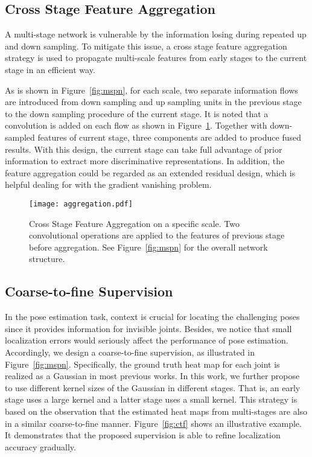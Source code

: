 \documentclass[10pt,twocolumn,letterpaper]{article}
\begin{document}
\subsection{Cross Stage Feature Aggregation}\label{section:CSFA}
\label{part:csfa}
A multi-stage network is vulnerable by the information losing during repeated up and down sampling. To mitigate this issue, a cross stage feature aggregation strategy is used to propagate multi-scale features from early stages to the current stage in an efficient way.

As is shown in Figure~\ref{fig:mspn}, for each scale, two separate information flows are introduced from down sampling and up sampling units in the previous stage to the down sampling procedure of the current stage. It is noted that a  convolution is added on each flow as shown in Figure~\ref{fig:aggr}. Together with down-sampled features of current stage, three components are added to produce fused results. With this design, the current stage can take full advantage of prior information to extract more discriminative representations. In addition, the feature aggregation could be regarded as an extended residual design, which is helpful dealing for with the gradient vanishing problem. 

\begin{figure}
	\centering
	\texttt{[image: aggregation.pdf]}
	\caption{Cross Stage Feature Aggregation on a specific scale. Two  convolutional operations are applied to the features of previous stage before aggregation. See Figure~\ref{fig:mspn} for the overall network structure.}
	\label{fig:aggr}
\end{figure}

\subsection{Coarse-to-fine Supervision}\label{setion:C2F}

In the pose estimation task, context is crucial for locating the challenging poses since it provides information for invisible joints. Besides, we notice that small localization errors would seriously affect the performance of pose estimation. Accordingly, we design a coarse-to-fine supervision, as illustrated in Figure~\ref{fig:mspn}. Specifically, the ground truth heat map for each joint is realized as a Gaussian in most previous works. In this work, we further propose to use different kernel sizes of the Gaussian in different stages. That is, an early stage uses a large kernel and a latter stage uses a small kernel. This strategy is based on the observation that the estimated heat maps from multi-stages are also in a similar coarse-to-fine manner. Figure~\ref{fig:ctf} shows an illustrative example. It demonstrates that the proposed supervision is able to refine localization accuracy gradually.
\end{document}
